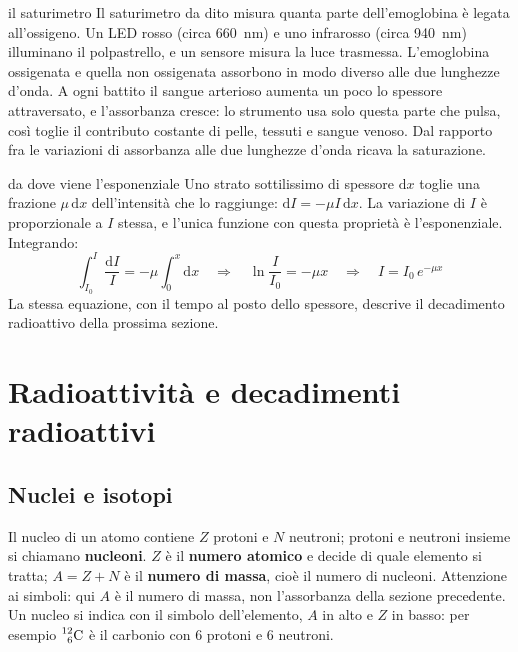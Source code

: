 \begin{applicazione}{il saturimetro}
Il saturimetro da dito misura quanta parte dell'emoglobina è legata all'ossigeno. Un LED rosso (circa \SI{660}{\nano\metre}) e uno infrarosso (circa \SI{940}{\nano\metre}) illuminano il polpastrello, e un sensore misura la luce trasmessa. L'emoglobina ossigenata e quella non ossigenata assorbono in modo diverso alle due lunghezze d'onda. A ogni battito il sangue arterioso aumenta un poco lo spessore attraversato, e l'assorbanza cresce: lo strumento usa solo questa parte che pulsa, così toglie il contributo costante di pelle, tessuti e sangue venoso. Dal rapporto fra le variazioni di assorbanza alle due lunghezze d'onda ricava la saturazione.
\end{applicazione}

\begin{approfondimento}{da dove viene l'esponenziale}
Uno strato sottilissimo di spessore $\mathrm{d}x$ toglie una frazione $\mu\,\mathrm{d}x$ dell'intensità che lo raggiunge: $\mathrm{d}I = -\mu I\,\mathrm{d}x$. La variazione di $I$ è proporzionale a $I$ stessa, e l'unica funzione con questa proprietà è l'esponenziale. Integrando:
\[
  \int_{I_0}^{I} \frac{\mathrm{d}I}{I} = -\mu \int_0^x \mathrm{d}x
  \quad\Longrightarrow\quad
  \ln\frac{I}{I_0} = -\mu x
  \quad\Longrightarrow\quad
  I = I_0\,e^{-\mu x}
\]
La stessa equazione, con il tempo al posto dello spessore, descrive il decadimento radioattivo della prossima sezione.
\end{approfondimento}

\section{Radioattività e decadimenti radioattivi}
\label{sec:ud7-radioattivita}

\subsection{Nuclei e isotopi}

Il nucleo di un atomo contiene $Z$ protoni e $N$ neutroni; protoni e neutroni insieme si chiamano \textbf{nucleoni}. $Z$ è il \textbf{numero atomico} e decide di quale elemento si tratta; $A = Z + N$ è il \textbf{numero di massa}, cioè il numero di nucleoni. Attenzione ai simboli: qui $A$ è il numero di massa, non l'assorbanza della sezione precedente. Un nucleo si indica con il simbolo dell'elemento, $A$ in alto e $Z$ in basso: per esempio $\prescript{12}{6}{\mathrm{C}}$ è il carbonio con 6 protoni e 6 neutroni.

